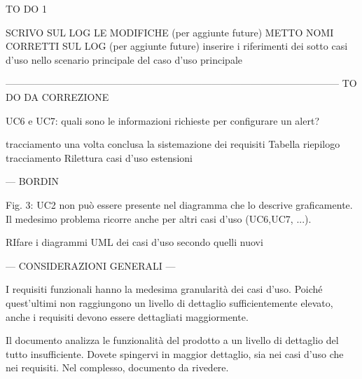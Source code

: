 TO DO 1

SCRIVO SUL LOG LE MODIFICHE (per aggiunte future)
METTO NOMI CORRETTI SUL LOG (per aggiunte future)
inserire i riferimenti dei sotto casi d'uso nello scenario principale del caso d'uso principale


------------------------------------------------------------------------------------------------------
TO DO DA CORREZIONE

UC6 e UC7: quali sono le informazioni richieste per configurare un alert? 

tracciamento una volta conclusa la sistemazione dei requisiti
Tabella riepilogo tracciamento
Rilettura casi d'uso estensioni

--- BORDIN

Fig. 3: UC2 non può essere presente nel diagramma che lo descrive graficamente. Il
medesimo problema ricorre anche per altri casi d’uso (UC6,UC7, ...). 

RIfare i diagrammi UML dei casi d'uso secondo quelli nuovi

--- CONSIDERAZIONI GENERALI ---

I requisiti funzionali hanno la medesima granularità dei casi d’uso. Poiché quest’ultimi
non raggiungono un livello di dettaglio sufficientemente elevato, anche i
requisiti devono essere dettagliati maggiormente.

Il documento analizza le funzionalità del prodotto a un livello di dettaglio del
tutto insufficiente. 
Dovete spingervi in maggior dettaglio, sia nei casi d’uso che nei requisiti. 
Nel complesso, documento da rivedere.